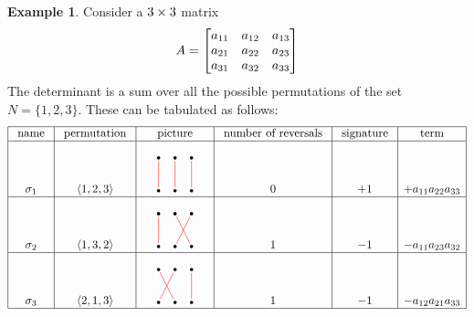 \documentclass[reqno]{amsart}
\theoremstyle{definition}
\newtheorem{example}[theorem]{Example}
\begin{document}
\begin{example}\label{eg-det-three}
 Consider a $3\times 3$ matrix
 \[ A =
     \left[\begin{matrix}
      a_{11} & a_{12} & a_{13} \\
      a_{21} & a_{22} & a_{23} \\
      a_{31} & a_{32} & a_{33}
     \end{matrix}\right]
 \]
 The determinant is a sum over all the possible permutations of the
 set $N=\{1,2,3\}$.  These can be tabulated as follows:
 \[
  \begin{array}{|c|c|c|c|c|c|} \hline
   \text{ name } &
   \text{ permutation } &
   \text{ picture } &
   \text{ number of reversals } &
   \text{ signature } &
   \text{ term } \\ \hline
   \sg_1 &
   \ip{1,2,3} &
   \begin{tikzpicture}[scale=0.5]
    \draw[white] (0,0) -- (4,3);
    \fill (1,2) circle(0.1);
    \fill (2,2) circle(0.1);
    \fill (3,2) circle(0.1);
    \fill (1,0) circle(0.1);
    \fill (2,0) circle(0.1);
    \fill (3,0) circle(0.1);
    \draw[red,shorten >=1mm,shorten <=1mm] (1,2) -- (1,0);
    \draw[red,shorten >=1mm,shorten <=1mm] (2,2) -- (2,0);
    \draw[red,shorten >=1mm,shorten <=1mm] (3,2) -- (3,0);
   \end{tikzpicture} &
   0 &
   +1 &
   +a_{11}a_{22}a_{33}
   \\ \hline
   \sg_2 &
   \ip{1,3,2} &
   \begin{tikzpicture}[scale=0.5]
    \draw[white] (0,0) -- (4,3);
    \fill (1,2) circle(0.1);
    \fill (2,2) circle(0.1);
    \fill (3,2) circle(0.1);
    \fill (1,0) circle(0.1);
    \fill (2,0) circle(0.1);
    \fill (3,0) circle(0.1);
    \draw[red,shorten >=1mm,shorten <=1mm] (1,2) -- (1,0);
    \draw[red,shorten >=1mm,shorten <=1mm] (2,2) -- (3,0);
    \draw[red,shorten >=1mm,shorten <=1mm] (3,2) -- (2,0);
   \end{tikzpicture} &
   1 &
   -1 &
   - a_{11}a_{23}a_{32}
   \\ \hline
   \sg_3 &
   \ip{2,1,3} &
   \begin{tikzpicture}[scale=0.5]
    \draw[white] (0,0) -- (4,3);
    \fill (1,2) circle(0.1);
    \fill (2,2) circle(0.1);
    \fill (3,2) circle(0.1);
    \fill (1,0) circle(0.1);
    \fill (2,0) circle(0.1);
    \fill (3,0) circle(0.1);
    \draw[red,shorten >=1mm,shorten <=1mm] (1,2) -- (2,0);
    \draw[red,shorten >=1mm,shorten <=1mm] (2,2) -- (1,0);
    \draw[red,shorten >=1mm,shorten <=1mm] (3,2) -- (3,0);
   \end{tikzpicture} &
   1 &
   -1 &
   - a_{12}a_{21}a_{33}
   \\ \hline

\end{array}\]
\end{example}
\end{document}
